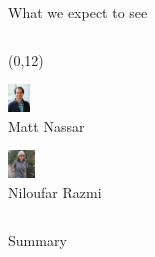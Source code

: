 \documentclass[bigger]{beamer}
\begin{document}
\begin{frame}[label={sec:orgcd13342}]{What we expect to see}
\begin{columns}
\begin{column}{0.5\columnwidth}

\begin{textblock}{5}(0,12)
\begin{minipage}[t]{3em}
\center
\includegraphics[height=2em]{img/matt-nassar.jpg}\\
\scriptsize
Matt Nassar
\end{minipage}
\begin{minipage}[t]{3em}
\center
\includegraphics[height=2em]{img/niloufar-razmi.jpeg}\\
\scriptsize
Niloufar Razmi
\end{minipage}
\end{textblock}
\end{column}
\end{columns}
\end{frame}

\begin{frame}[label={sec:orgbf21ab9}]{Summary}
\end{frame}
\end{document}

